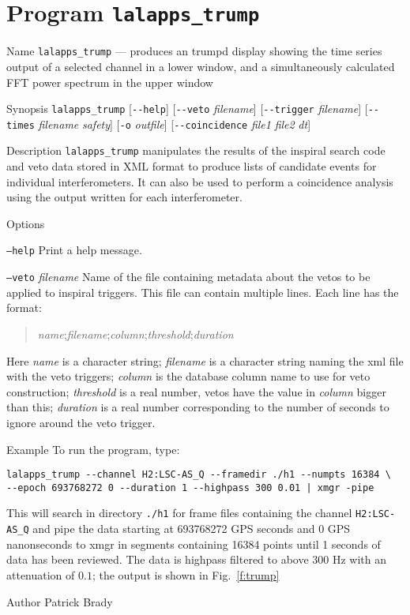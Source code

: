 \section{Program \texttt{lalapps\_trump}}
\label{program:lalapps-trump}

\begin{entry}

\item[Name]
\verb$lalapps_trump$ --- produces an trumpd display showing the time
series output of a selected channel in a lower window, and a simultaneously
calculated FFT power spectrum in the upper window

\item[Synopsis]
\verb$lalapps_trump$ [\verb$--help$] [\verb$--veto$ \textit{filename}] 
[\verb$--trigger$ \textit{filename}] [\verb$--times$ \textit{filename}
\textit{safety}] [\verb$-o$ \textit{outfile}] 
[\verb$--coincidence$ \textit{file1} \textit{file2} \textit{dt}]

\item[Description]
\verb$lalapps_trump$ manipulates the results of the inspiral search code
and veto data stored in XML format to produce lists of candidate
events for individual interferometers.   It can also be used to
perform a coincidence analysis using the output written for each
interferometer.  

\item[Options]\leavevmode
\begin{entry}
\item[\texttt{--help}]
Print a help message.
\item[\texttt{--veto} \textit{filename}]
Name of the file containing metadata about the vetos to be applied to
inspiral triggers.   This file can contain multiple lines.  Each line
has the format:
\begin{quote}
\textit{name};\textit{filename};\textit{column};\textit{threshold};\textit{duration}
\end{quote}
Here \textit{name} is a character string;  \textit{filename} is a
character string naming the xml file with the veto triggers;
\textit{column} is the database column name to use for veto
construction;  \textit{threshold} is a real number,  vetos have the
value in \textit{column} bigger than this; \textit{duration} is a real
number corresponding to the number of seconds to ignore around the
veto trigger.

\end{entry}

\item[Example]
To run the program,  type:
\begin{verbatim}
lalapps_trump --channel H2:LSC-AS_Q --framedir ./h1 --numpts 16384 \
--epoch 693768272 0 --duration 1 --highpass 300 0.01 | xmgr -pipe
\end{verbatim}
This will search in directory \verb$./h1$ for frame files containing
the channel \verb$H2:LSC-AS_Q$ and pipe the data starting at 693768272
GPS seconds and 0 GPS nanonseconds to xmgr in segments containing 16384 
points until 1 seconds of data has been reviewed.  The data is highpass 
filtered to above 300 Hz with an attenuation of $0.1$;  the output is
shown in Fig.~\ref{f:trump}

\item[Author]
Patrick Brady

\end{entry}
